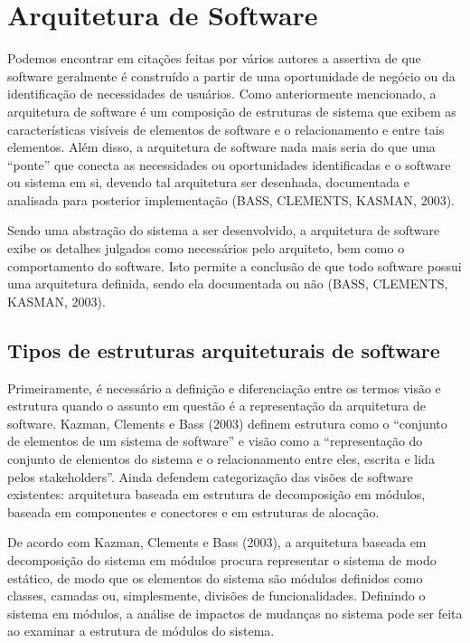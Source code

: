 \chapter[Arquitetura de Software]{Arquitetura de Software}

Podemos encontrar em citações feitas por vários autores a assertiva de que software geralmente é construído a partir de uma oportunidade de negócio ou da identificação de necessidades de usuários. Como anteriormente mencionado, a arquitetura de software é um composição de estruturas de sistema que exibem as características visíveis de elementos de software e o relacionamento e entre  tais elementos. Além disso, a arquitetura de software nada mais seria do que uma “ponte” que conecta as necessidades ou oportunidades identificadas e o software ou sistema em si, devendo tal arquitetura ser desenhada, documentada e analisada para posterior implementação (BASS, CLEMENTS, KASMAN, 2003).

Sendo uma abstração do sistema a ser desenvolvido, a arquitetura de software exibe os detalhes julgados como necessários pelo arquiteto, bem como o comportamento do software. Isto permite a conclusão de que todo software possui uma arquitetura definida, sendo ela documentada ou não (BASS, CLEMENTS, KASMAN, 2003).

\section{Tipos de estruturas arquiteturais de software}
Primeiramente, é necessário a definição e diferenciação entre os termos visão e estrutura quando o assunto em questão é a representação da arquitetura de software. Kazman, Clements e Bass (2003) definem estrutura como o “conjunto de elementos de um sistema de software”  e visão como a “representação do conjunto de elementos do sistema e o relacionamento entre eles, escrita e lida pelos stakeholders”. Ainda defendem categorização das visões de software existentes: arquitetura baseada em estrutura de decomposição em módulos, baseada em componentes e conectores e em estruturas de alocação.

De acordo com Kazman, Clements e Bass (2003), a arquitetura baseada em decomposição do sistema em módulos procura representar o sistema de modo estático, de modo que os elementos do sistema são módulos definidos como classes, camadas ou, simplesmente, divisões de funcionalidades. Definindo o sistema em módulos, a análise de impactos de mudanças no sistema pode ser feita ao examinar a estrutura de módulos do sistema.

